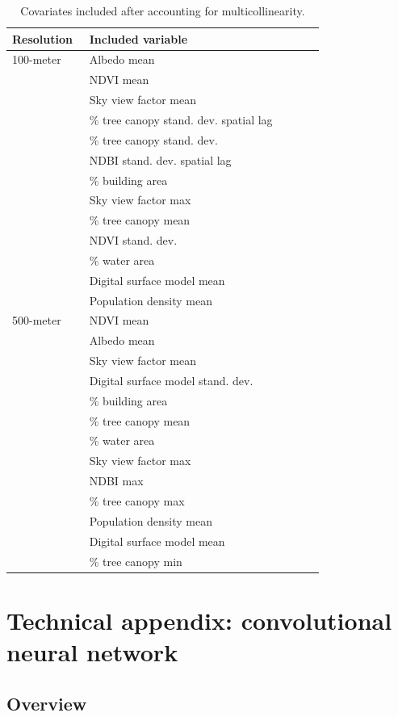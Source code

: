 \documentclass[review]{elsarticle}
\begin{document}
\begin{table}[h]
\centering
\caption{Covariates included after accounting for multicollinearity.}
\label{tab:vif}
\begin{tabular}{p{0.23\linewidth} p{0.7\linewidth}}
\toprule
       \textbf{Resolution} & \textbf{Included variable} \\
\midrule
100-meter  & Albedo mean \\
& NDVI mean \\
& Sky view factor mean \\
& \% tree canopy stand. dev. spatial lag \\
& \% tree canopy stand. dev. \\
& NDBI stand. dev. spatial lag \\
& \% building area\\
& Sky view factor max \\
& \% tree canopy mean \\
& NDVI stand. dev. \\
& \% water area\\
& Digital surface model mean \\
& Population density mean\\
\hline
500-meter & NDVI mean \\ 
& Albedo mean \\
& Sky view factor mean \\
& Digital surface model stand. dev. \\
& \% building area\\
& \% tree canopy mean \\
& \% water area\\
& Sky view factor max \\
& NDBI max \\
& \% tree canopy max \\
& Population density mean\\
& Digital surface model mean \\
& \% tree canopy min \\
\bottomrule
\end{tabular}
\end{table}


\newpage
\section{Technical appendix: convolutional neural network}
\label{ss:cnn}
\subsection{Overview}
\end{document}
